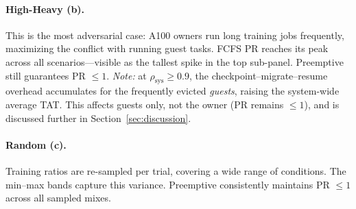 
\paragraph{High-Heavy (b).}
This is the most adversarial case: A100 owners run long training jobs frequently,
maximizing the conflict with running guest tasks.
FCFS PR reaches its peak across all scenarios---visible as the tallest spike
in the top sub-panel.
Preemptive still guarantees PR $\leq 1$.
\emph{Note:} at $\rho_\mathrm{sys} \geq 0.9$, the checkpoint--migrate--resume
overhead accumulates for the frequently evicted \emph{guests},
raising the system-wide average TAT.
This affects guests only, not the owner (PR remains $\leq 1$), and is
discussed further in Section~\ref{sec:discussion}.


\paragraph{Random (c).}
Training ratios are re-sampled per trial, covering a wide range of conditions.
The min--max bands capture this variance.
Preemptive consistently maintains PR $\leq 1$ across all sampled mixes.

